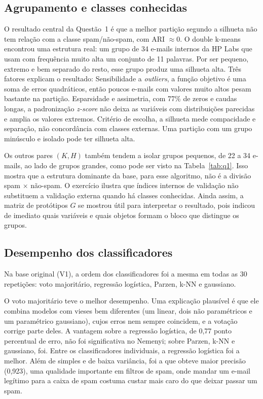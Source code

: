 \documentclass[12pt,reqno]{amsart}
\begin{document}
\subsection*{Agrupamento e classes conhecidas}
O resultado central da Questão~1 é que a melhor partição segundo a silhueta não tem relação
com a classe spam/não-spam, com ARI $\approx 0$. O double k-means encontrou uma estrutura real: um
grupo de 34 e-mails internos da HP Labs que usam com frequência muito alta um conjunto de 11
palavras. Por ser pequeno, extremo
e bem separado do resto, esse grupo produz uma silhueta alta. Três fatores explicam o resultado: Sensibilidade a \emph{outliers}, a função objetivo é uma soma de erros quadráticos, então poucos e-mails com valores muito altos pesam bastante na partição. Esparsidade e assimetria, com 77\% de zeros e caudas longas, a padronização
  \emph{z-score} não deixa as variáveis com distribuições parecidas e amplia os valores extremos. Critério de escolha, a silhueta mede compacidade e separação, não concordância
  com classes externas. Uma partição com um grupo minúsculo e isolado pode ter silhueta alta.

Os outros pares $(K,H)$ também tendem a isolar grupos pequenos, de 22 a 34 e-mails, ao lado de
grupos grandes, como pode ser visto na Tabela~\ref{tab:q1}. Isso mostra que a estrutura dominante da base, para esse
algoritmo, não é a divisão spam $\times$ não-spam. O exercício ilustra que
índices internos de validação não substituem a validação externa quando há classes conhecidas.
Ainda assim, a matriz de protótipos $G$ se mostrou útil para interpretar o resultado, pois indicou
de imediato quais variáveis e quais objetos formam o bloco que distingue os grupos.

\subsection*{Desempenho dos classificadores}
Na base original (V1), a ordem dos classificadores foi a mesma em todas as 30 repetições: voto
majoritário, regressão logística, Parzen, k-NN e gaussiano.

O voto majoritário teve o melhor desempenho. Uma explicação plausível é que ele combina modelos
com vieses bem diferentes (um linear, dois não paramétricos e um paramétrico gaussiano), cujos
erros nem sempre coincidem, e a votação corrige parte deles. A vantagem sobre a regressão
logística, de 0,77 ponto percentual de erro, não foi significativa no Nemenyi; sobre Parzen, k-NN
e gaussiano, foi. Entre os classificadores individuais, a regressão logística foi a melhor. Além
de simples e de baixa variância, foi a que obteve maior precisão (0,923), uma qualidade
importante em filtros de spam, onde mandar um e-mail legítimo para a caixa de spam costuma
custar mais caro do que deixar passar um spam.
\end{document}
